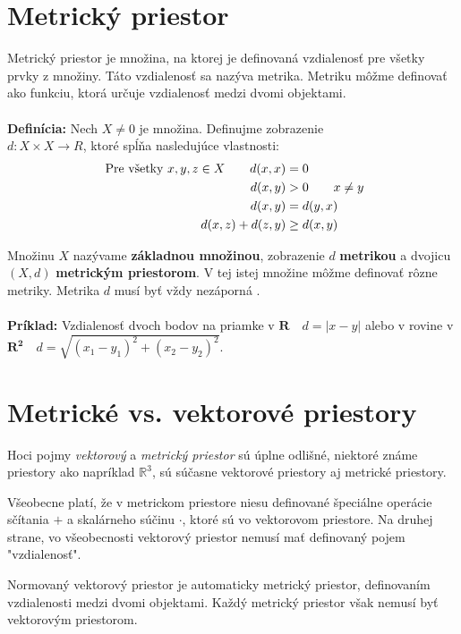 \documentclass[12pt,a4paper,oneside]{fithesis2}
\begin{document}
    \section{Metrický priestor}
    
    Metrický priestor je množina, na ktorej je definovaná vzdialenosť pre všetky prvky z množiny. Táto vzdialenosť sa nazýva metrika. Metriku môžme definovať ako funkciu, ktorá určuje vzdialenosť medzi dvomi objektami. \\ \\
    \textbf{Definícia:} Nech $X\neq 0$ je množina. Definujme zobrazenie \\ $d: X \times X \rightarrow R $, ktoré spĺňa nasledujúce vlastnosti:
    \begin{align*}
    \textrm{ Pre všetky } x,y,z \in X \qquad d(x,x) &= 0 \\
    d(x,y) &\textgreater 0 \qquad x\neq y \\
    d(x,y) &= d(y,x) \\
    d(x,z) + d(z,y) &\geq d(x,y)
    \end{align*}
    
    Množinu \textbf{$X$} nazývame \textbf{základnou množinou}, zobrazenie $d$ \textbf{metrikou} a  dvojicu $(X,d)$ \textbf{metrickým priestorom}.
    V tej istej množine môžme definovať rôzne metriky. Metrika $d$ musí byť vždy nezáporná \cite{Yianilos:1993:DSA:313559.313789}. \\ \\
    \textbf{Príklad:} 
    Vzdialenosť dvoch bodov na priamke v $ \mathbf{R} \quad d=|x-y| $ alebo v rovine v
     $\mathbf{R^2} \quad d = \sqrt{(x_1-y_1)^2+(x_2-y_2)^2}$.
    
    \section{Metrické vs. vektorové priestory}
    
    Hoci pojmy \textit{vektorový} a \textit{metrický priestor} sú úplne odlišné, niektoré známe priestory ako napríklad $\mathbb{R}^3$, sú súčasne vektorové priestory aj metrické priestory. 
    
    Všeobecne platí, že v metrickom priestore niesu definované špeciálne operácie sčítania $+$ a skalárneho súčinu $\cdot$, ktoré sú vo vektorovom priestore. Na druhej strane, vo všeobecnosti vektorový priestor nemusí mať definovaný pojem "vzdialenosť".
    
    Normovaný vektorový priestor je automaticky metrický priestor, definovaním vzdialenosti medzi dvomi objektami. Každý metrický priestor však nemusí byť vektorovým priestorom.
    
\end{document}
